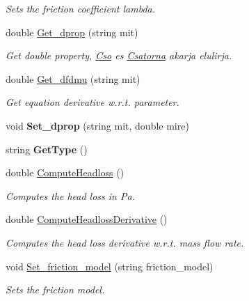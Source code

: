 \begin{DoxyCompactItemize}
\begin{DoxyCompactList}\small\item\em Sets the friction coefficient lambda. \end{DoxyCompactList}\item 
\mbox{\label{class_cso_a674c356a597eb9d6c9a46726b35e2a00}} 
double \hyperlink{class_cso_a674c356a597eb9d6c9a46726b35e2a00}{Get\+\_\+dprop} (string mit)
\begin{DoxyCompactList}\small\item\em Get double property, \hyperlink{class_cso}{Cso} es \hyperlink{class_csatorna}{Csatorna} akarja elulirja. \end{DoxyCompactList}\item 
\mbox{\label{class_cso_a794959559cb679efb0529417e1df6556}} 
double \hyperlink{class_cso_a794959559cb679efb0529417e1df6556}{Get\+\_\+dfdmu} (string mit)
\begin{DoxyCompactList}\small\item\em Get equation derivative w.\+r.\+t. parameter. \end{DoxyCompactList}\item 
\mbox{\label{class_cso_ae6db4734838a6261e89caeb53269e990}} 
void {\bfseries Set\+\_\+dprop} (string mit, double mire)
\item 
\mbox{\label{class_cso_a20b7469a9b992da3bc25c647cdfa23c8}} 
string {\bfseries Get\+Type} ()
\item 
double \hyperlink{class_cso_a796d4ff0f69732001c91abe7e5ce7ed7}{Compute\+Headloss} ()
\begin{DoxyCompactList}\small\item\em Computes the head loss in Pa. \end{DoxyCompactList}\item 
double \hyperlink{class_cso_a5f8536643bc971ca70aebef850fa53a1}{Compute\+Headloss\+Derivative} ()
\begin{DoxyCompactList}\small\item\em Computes the head loss derivative w.\+r.\+t. mass flow rate. \end{DoxyCompactList}\item 
void \hyperlink{class_cso_a113196b16e49417924fea36b770f4d84}{Set\+\_\+friction\+\_\+model} (string friction\+\_\+model)
\begin{DoxyCompactList}\small\item\em Sets the friction model. \end{DoxyCompactList}\end{DoxyCompactItemize}

